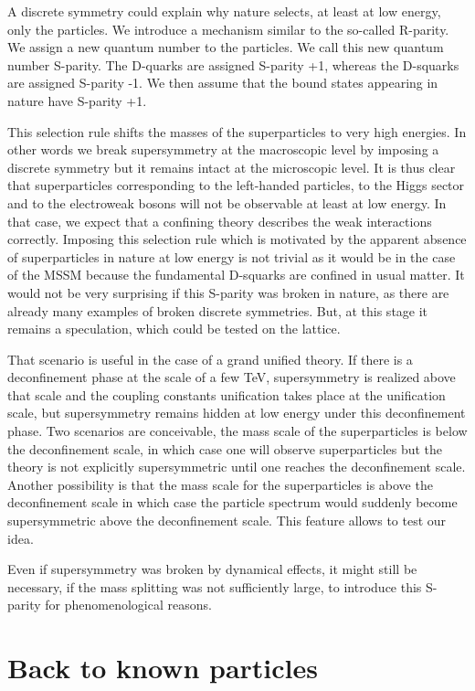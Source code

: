 \documentclass[a4paper,12pt]{article}
\begin{document}
A discrete symmetry could explain why nature selects, at least at low
energy, only the particles.  We introduce a mechanism similar to the
so-called R-parity. We assign a new quantum number to the particles.
We call this new quantum number S-parity. The D-quarks are assigned
S-parity +1, whereas the D-squarks are assigned S-parity -1. We then
assume that the bound states appearing in nature have S-parity +1.

This selection rule shifts the masses of the superparticles to very
high energies. In other words we break supersymmetry at the
macroscopic level by imposing a discrete symmetry but it remains
intact at the microscopic level. It is thus clear that superparticles
corresponding to the left-handed particles, to the Higgs sector and to
the electroweak bosons will not be observable at least at low energy.
In that case, we expect that a confining theory describes the weak
interactions correctly.  Imposing this selection rule which is
motivated by the apparent absence of superparticles in nature at low
energy is not trivial as it would be in the case of the MSSM because
the fundamental D-squarks are confined in usual matter. It would not
be very surprising if this S-parity was broken in nature, as there are
already many examples of broken discrete symmetries. But, at this
stage it remains a speculation, which could be tested on the lattice.


That scenario is useful in the case of a grand unified theory.  If
there is a deconfinement phase at the scale of a few TeV,
supersymmetry is realized above that scale and the coupling constants
unification takes place at the unification scale, but supersymmetry
remains hidden at low energy under this deconfinement phase.  Two
scenarios are conceivable, the mass scale of the superparticles is
below the deconfinement scale, in which case one will observe
superparticles but the theory is not explicitly supersymmetric until
one reaches the deconfinement scale.  Another possibility is that the
mass scale for the superparticles is above the deconfinement scale in
which case the particle spectrum would suddenly become supersymmetric
above the deconfinement scale. This feature allows to test our idea.




Even if supersymmetry was broken by dynamical effects, it might still
be necessary, if the mass splitting was not sufficiently large, to
introduce this S-parity for phenomenological reasons.

\section{Back to known particles}
\end{document}
